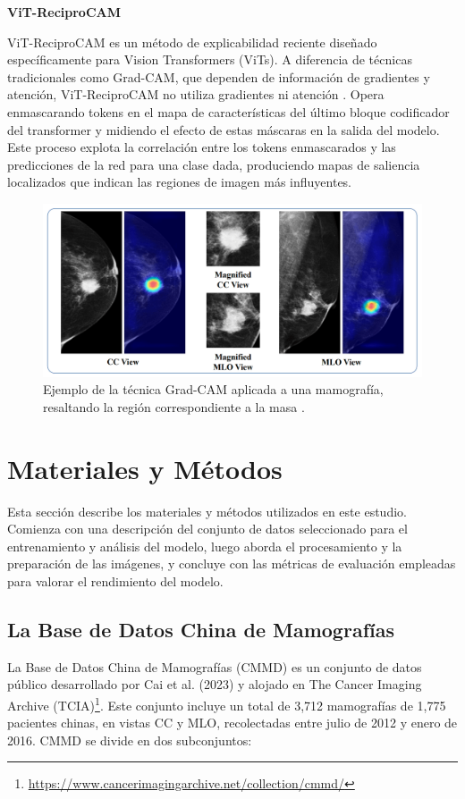\documentclass[a4paper,10pt]{book}
\begin{document}
\textbf{ViT-ReciproCAM}

ViT-ReciproCAM es un método de explicabilidad reciente diseñado específicamente para Vision Transformers (ViTs). A diferencia de técnicas tradicionales como Grad-CAM, que dependen de información de gradientes y atención, ViT-ReciproCAM no utiliza gradientes ni atención \cite{byun_vit-reciprocam_2023}. Opera enmascarando tokens en el mapa de características del último bloque codificador del transformer y midiendo el efecto de estas máscaras en la salida del modelo. Este proceso explota la correlación entre los tokens enmascarados y las predicciones de la red para una clase dada, produciendo mapas de saliencia localizados que indican las regiones de imagen más influyentes.

\begin{figure}
\centering
\includegraphics[width=0.8\linewidth]{reports//assets/grad-cam.png}
\caption[Grad-CAM example]{Ejemplo de la técnica Grad-CAM aplicada a una mamografía, resaltando la región correspondiente a la masa \cite{panambur_classification_2023}.}
\label{fig:grad-cam-example}
\end{figure}

\chapter{Materiales y Métodos}

Esta sección describe los materiales y métodos utilizados en este estudio. Comienza con una descripción del conjunto de datos seleccionado para el entrenamiento y análisis del modelo, luego aborda el procesamiento y la preparación de las imágenes, y concluye con las métricas de evaluación empleadas para valorar el rendimiento del modelo.

\section{La Base de Datos China de Mamografías}

La Base de Datos China de Mamografías (CMMD) es un conjunto de datos público desarrollado por Cai et al. (2023) \cite{cai_online_2023} y alojado en The Cancer Imaging Archive (TCIA)\footnote{\url{https://www.cancerimagingarchive.net/collection/cmmd/}}. Este conjunto incluye un total de 3,712 mamografías de 1,775 pacientes chinas, en vistas CC y MLO, recolectadas entre julio de 2012 y enero de 2016. CMMD se divide en dos subconjuntos:
\end{document}
